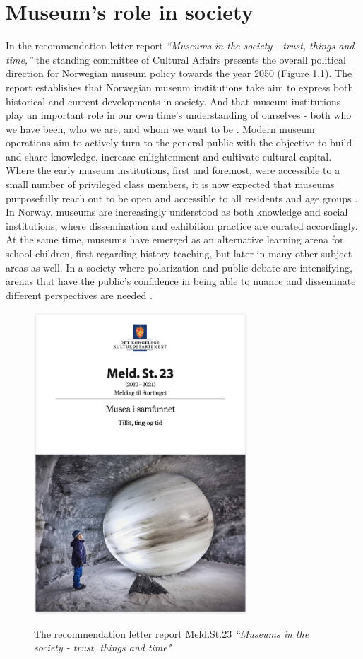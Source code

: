 \section{Museum's role in society}
In the recommendation letter report \emph{“Museums in the society - trust, things and time,”} the standing committee of Cultural Affairs presents the overall political direction for Norwegian museum policy towards the year 2050 (Figure 1.1). The report establishes that Norwegian museum institutions take aim to express both historical and current developments in society. And that museum institutions play an important role in our own time’s understanding of ourselves - both who we have been, who we are, and whom we want to be \autocite[p. 7]{melding23}. Modern museum operations aim to actively turn to the general public with the objective to build and share knowledge, increase enlightenment and cultivate cultural capital. Where the early museum institutions, first and foremost, were accessible to a small number of privileged class members, it is now expected that museums purposefully reach out to be open and accessible to all residents and age groups \autocite[p. 14]{melding23}. In Norway, museums are increasingly understood as both knowledge and social institutions, where dissemination and exhibition practice are curated accordingly. At the same time, museums have emerged as an alternative learning arena for school children, first regarding history teaching, but later in many other subject areas as well. In a society where polarization and public debate are intensifying, arenas that have the public's confidence in being able to nuance and disseminate different perspectives are needed \autocite[p. 7]{melding23}.

\begin{figure}[H]   
\centering
\includegraphics[width=8cm]{pictures/Introduction/stortingsmelding_hoykant.png}
\caption{The recommendation letter report Meld.St.23 \emph{“Museums in the society - trust, things and time"}} {\autocite[p. 1]{melding23}}
\end{figure}

